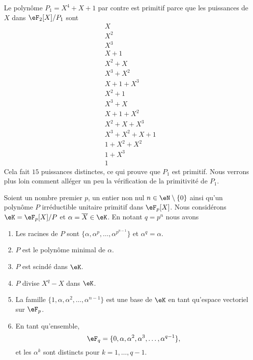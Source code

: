 \begin{example}
	Le polynôme \( P_1=X^4+X+1\) par contre est primitif parce que les puissances de \( X\) dans \( \eF_2[X]/P_1\) sont
	\begin{subequations}
		\begin{align}
			 & X           \\
			 & X^2         \\
			 & X^3         \\
			 & X+1         \\
			 & X^2+X       \\
			 & X^3+X^2     \\
			 & X+1+X^3     \\
			 & X^2+1       \\
			 & X^3+X       \\
			 & X+1+X^2     \\
			 & X^2+X+X^3   \\
			 & X^3+X^2+X+1 \\
			 & 1+X^2+X^2   \\
			 & 1+X^3       \\
			 & 1
		\end{align}
	\end{subequations}
	Cela fait \( 15\) puissances distinctes, ce qui prouve que \( P_1\) est primitif. Nous verrons plus loin comment alléger un peu la vérification de la primitivité de \( P_1\).
\end{example}

\begin{proposition}            \label{PropNsLqWb}
	Soient un nombre premier \( p\), un entier non nul \( n\in \eN\setminus\{ 0 \}\) ainsi qu'un polynôme \( P\) irréductible unitaire primitif dans \( \eF_p[X]\). Nous considérons \( \eK=\eF_p[X]/P\) et \( \alpha=\overline X\in \eK\). En notant \( q=p^n\) nous avons
	\begin{enumerate}
		\item
		      Les racines de \( P\) sont \( \{ \alpha,\alpha^p,\ldots, \alpha^{p^{n-1}} \}\) et \( \alpha^q=\alpha\).
		\item
		      \( P\) est le polynôme minimal de \( \alpha\).
		\item
		      \( P\) est scindé dans \( \eK\).
		\item
		      \( P\) divise \( X^q-X\) dans \( \eK\).
		\item
		      La famille \( \{1, \alpha,\alpha^2,\ldots, \alpha^{n-1} \}\) est une base de \( \eK\) en tant qu'espace vectoriel sur \( \eF_p\).
		\item
		      En tant qu'ensemble,
		      \begin{equation}
			      \eF_q=\{0, \alpha,\alpha^2,\alpha^3,\ldots, \alpha^{q-1} \},
		      \end{equation}
		      et les \( \alpha^k\) sont distincts pour \( k=1,\ldots, q-1\).
	\end{enumerate}
\end{proposition}

